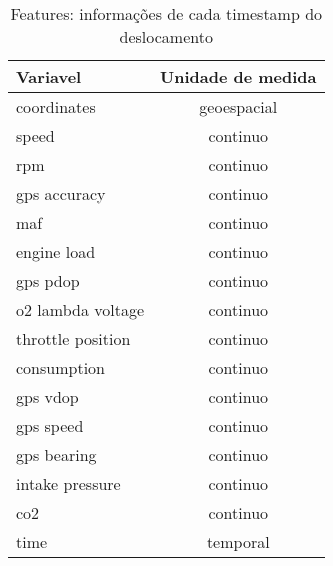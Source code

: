 \documentclass[10pt, conference]{IEEEtran}
\begin{document}
\begin{itemize}
\begin{table}
\caption{Features: informações de cada timestamp do deslocamento}
\label{tab:perfs}
\centering
\begin{tabular}{l|c}
\multicolumn{1}{l|}{\bf Variavel} &
\multicolumn{1}{l}{\bf Unidade de medida}  \\ \hline
coordinates        & geoespacial       \\
speed              & continuo         \\
rpm                & continuo       \\
gps accuracy       & continuo       \\
maf                & continuo         \\
engine load        & continuo       \\
gps pdop           & continuo       \\
o2 lambda voltage  & continuo       \\
throttle position  & continuo       \\
consumption        & continuo       \\
gps vdop           & continuo       \\
gps speed          & continuo       \\
gps bearing        & continuo       \\
intake pressure    & continuo       \\
co2                & continuo       \\
time               & temporal       \\

\end{tabular}
\end{table}









\end{itemize}
\end{document}
